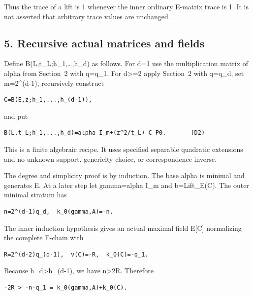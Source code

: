 Thus the trace of a lift is 1 whenever the inner ordinary E-matrix trace
is 1. It is not asserted that arbitrary trace values are unchanged.

\hypertarget{dyadic_tower-recursive-actual-matrices-and-fields}{%
\subsection{5. Recursive actual matrices and
fields}\label{dyadic_tower-recursive-actual-matrices-and-fields}}

Define B(L,t\_L;h\_1,\ldots,h\_d) as follows. For d=1 use the
multiplication matrix of alpha from Section~2 with q=q\_1. For
d\textgreater=2 apply Section~2 with q=q\_d, set m=2\^{}(d-1),
recursively construct

\begin{Verbatim}[fontsize=\small,breaklines=true,breakanywhere=true]
C=B(E,z;h_1,...,h_(d-1)),
\end{Verbatim}

and put

\begin{Verbatim}[fontsize=\small,breaklines=true,breakanywhere=true]
B(L,t_L;h_1,...,h_d)=alpha I_m+(z^2/t_L) C P0.       (D2)
\end{Verbatim}

This is a finite algebraic recipe. It uses specified separable quadratic
extensions and no unknown support, genericity choice, or correspondence
inverse.

The degree and simplicity proof is by induction. The base alpha is
minimal and generates E. At a later step let gamma=alpha I\_m and
b=Lift\_E(C). The outer minimal stratum has

\begin{Verbatim}[fontsize=\small,breaklines=true,breakanywhere=true]
n=2^(d-1)q_d,  k_0(gamma,A)=-n.
\end{Verbatim}

The inner induction hypothesis gives an actual maximal field E{[}C{]}
normalizing the complete E-chain with

\begin{Verbatim}[fontsize=\small,breaklines=true,breakanywhere=true]
R=2^(d-2)q_(d-1),  v(C)=-R,  k_0(C)=-q_1.
\end{Verbatim}

Because h\_d\textgreater h\_(d-1), we have n\textgreater2R. Therefore

\begin{Verbatim}[fontsize=\small,breaklines=true,breakanywhere=true]
-2R > -n-q_1 = k_0(gamma,A)+k_0(C).
\end{Verbatim}

